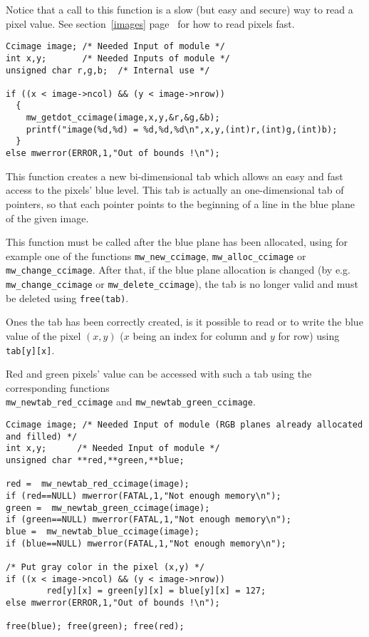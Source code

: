 Notice that a call to this function is a slow (but easy and secure) way to 
read a pixel value.
See section~\ref{images} page~\pageref{images} for how to read pixels fast.

\Next
\Example
\begin{verbatim}
Ccimage image; /* Needed Input of module */
int x,y;       /* Needed Inputs of module */
unsigned char r,g,b;  /* Internal use */

if ((x < image->ncol) && (y < image->nrow))
  {	
    mw_getdot_ccimage(image,x,y,&r,&g,&b);
    printf("image(%d,%d) = %d,%d,%d\n",x,y,(int)r,(int)g,(int)b);
  }
else mwerror(ERROR,1,"Out of bounds !\n");

\end{verbatim}

\newpage %
\Description
This function creates a new bi-dimensional tab which allows an easy and fast
access to the pixels' blue level.
This tab is actually an one-dimensional tab of pointers, so that each pointer 
points to the beginning of a line in the blue plane of the given image.

This function must be called after the blue plane has been allocated,
using for example one of the functions \verb+mw_new_ccimage+, 
\verb+mw_alloc_ccimage+ or \verb+mw_change_ccimage+. 
After that, if the blue plane allocation is changed
(by e.g. \verb+mw_change_ccimage+ or \verb+mw_delete_ccimage+), the tab is
no longer valid and must be deleted using \verb+free(tab)+.

Ones the tab has been correctly created, is it possible to read or to
write the blue value of the pixel $(x,y)$ ($x$ being an index for column and $y$
for row) using \verb+tab[y][x]+.

Red and green pixels' value can be accessed with such a tab using 
the corresponding functions \\
\verb+mw_newtab_red_ccimage+ and \verb+mw_newtab_green_ccimage+.

\Next
\Example
\begin{verbatim}
Ccimage image; /* Needed Input of module (RGB planes already allocated and filled) */
int x,y;      /* Needed Input of module */
unsigned char **red,**green,**blue;

red =  mw_newtab_red_ccimage(image);
if (red==NULL) mwerror(FATAL,1,"Not enough memory\n");
green =  mw_newtab_green_ccimage(image);
if (green==NULL) mwerror(FATAL,1,"Not enough memory\n");
blue =  mw_newtab_blue_ccimage(image);
if (blue==NULL) mwerror(FATAL,1,"Not enough memory\n");

/* Put gray color in the pixel (x,y) */
if ((x < image->ncol) && (y < image->nrow)) 
        red[y][x] = green[y][x] = blue[y][x] = 127;
else mwerror(ERROR,1,"Out of bounds !\n");

free(blue); free(green); free(red);
\end{verbatim}

